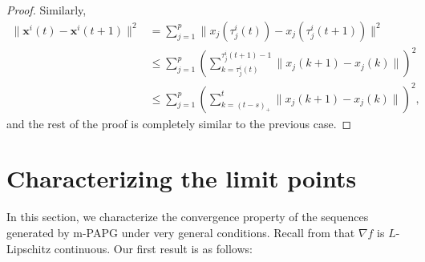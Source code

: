 \documentclass[leqno,onefignum,onetabnum]{siamart0516}
\newcommand{\xb}{\mathbf{x}}
\newcommand{\dind}{k}
\newcommand{\mspg}{\textsf{m-PAPG}\xspace}
\begin{document}
\begin{proof}
	Similarly,
	\begin{align*}
	\|\xb^{i}(t) - \xb^{i}(t+1)\|^2 &= \sum_{j=1}^p \|x_j(\tau_{j}^i(t)) - x_j(\tau_{j}^i(t+1))\|^2 
	\\ 
	&\leq 
	 \sum_{j=1}^p \left(\sum_{\dind = \tau_j^i(t)}^{\tau_j^i(t+1)-1} \|x_j(\dind+1) -  x_j(\dind) \|\right)^2
	 \\
	 &\leq
	 \sum_{j=1}^p \left(\sum_{\dind = (t-s)_+}^{t} \|x_j(\dind+1) -  x_j(\dind) \|\right)^2,
	\end{align*}
	and the rest of the proof is completely similar to the previous case.
 \end{proof}



\section{Characterizing the limit points}\label{sec: limit point}
In this section, we characterize the convergence property of the sequences generated by \mspg under very general conditions. 
Recall from  that $\nabla f$ is $L$-Lipschitz continuous. 
Our first result is as follows:
\end{document}
